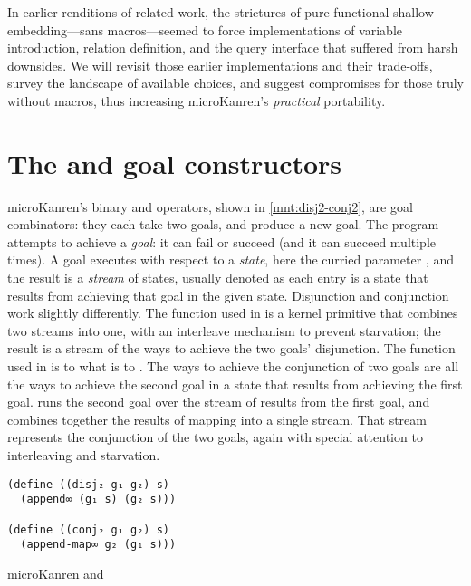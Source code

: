 \documentclass[sigplan,balance=true,pbalance=true,natbib=false]{acmart}
\begin{document}
In earlier renditions of related work, the strictures of pure
functional shallow embedding---sans macros---seemed to force
implementations of variable introduction, relation definition, and the
query interface that suffered from harsh downsides. We will revisit
those earlier implementations and their trade-offs, survey the
landscape of available choices, and suggest compromises for those
truly without macros, thus increasing microKanren's \emph{practical}
portability.

\section{The  and  goal
  constructors}\label{sec:conde}

microKanren's binary  and 
operators, shown in \cref{mnt:disj2-conj2}, are goal combinators: they
each take two goals, and produce a new goal. The program attempts to achieve
a \emph{goal}: it can fail or succeed (and it can succeed multiple
times). A goal executes with respect to a \emph{state}, here the
curried parameter , and the result is a \emph{stream} of
states, usually denoted  as each entry is a state that
results from achieving that goal in the given state.
Disjunction and conjunction work slightly differently. The
 function used in  is a kernel
primitive that combines two streams into one, with an interleave
mechanism to prevent starvation; the result is a stream of the ways to
achieve the two goals' disjunction. The 
function used in  is to
 what  is
to . The ways to achieve the conjunction of two
goals are all the ways to achieve the second goal in a state that
results from achieving the first goal.\@ {} runs
the second goal over the stream of results from the first goal, and
combines together the results of mapping into a single stream. That
stream represents the conjunction of the two goals, again with special
attention to interleaving and starvation.

\begin{listing}
  \begin{verbatim}
(define ((disj₂ g₁ g₂) s)
  (append∞ (g₁ s) (g₂ s)))

(define ((conj₂ g₁ g₂) s)
  (append-map∞ g₂ (g₁ s)))
  \end{verbatim}
  \caption{microKanren  and }\label{mnt:disj2-conj2}
\end{listing}
\end{document}
